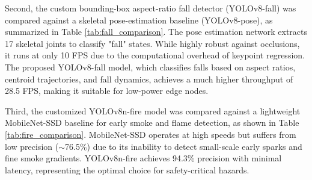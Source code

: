 \documentclass[12pt,a4paper]{article}
\begin{document}
\begin{table}[h]
    \centering
    \caption{Face Verification Model Comparison on Edge Hardware}
    \label{tab:face_comparison}
\end{table}

Second, the custom bounding-box aspect-ratio fall detector (YOLOv8-fall) was compared against a skeletal pose-estimation baseline (YOLOv8-pose), as summarized in Table \ref{tab:fall_comparison}. 
The pose estimation network extracts 17 skeletal joints to classify "fall" states. While highly robust against occlusions, it runs at only 10 FPS due to the computational overhead of keypoint regression. The proposed YOLOv8-fall model, which classifies falls based on aspect ratios, centroid trajectories, and fall dynamics, achieves a much higher throughput of 28.5 FPS, making it suitable for low-power edge nodes.

\begin{table}[h]
    \centering
    \caption{Fall Detection Model Comparison on Edge Hardware}
    \label{tab:fall_comparison}
\end{table}

Third, the customized YOLOv8n-fire model was compared against a lightweight MobileNet-SSD baseline for early smoke and flame detection, as shown in Table \ref{tab:fire_comparison}. 
MobileNet-SSD operates at high speeds but suffers from low precision ($\sim$76.5\%) due to its inability to detect small-scale early sparks and fine smoke gradients. YOLOv8n-fire achieves 94.3\% precision with minimal latency, representing the optimal choice for safety-critical hazards.
\end{document}
